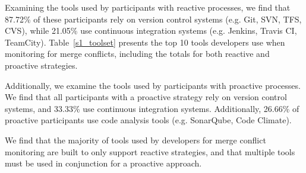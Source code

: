 
Examining the tools used by participants with reactive processes, we find that 87.72\% of these participants rely on version control systems (e.g. Git, SVN, TFS, CVS), while 21.05\% use continuous integration systems (e.g. Jenkins, Travis CI, TeamCity).
Table~\ref{s1_toolset} presents the top 10 tools developers use when monitoring for merge conflicts, including the totals for both reactive and proactive strategies.

Additionally, we examine the tools used by participants with proactive processes.
We find that all participants with a proactive strategy rely on version control systems, and 33.33\% use continuous integration systems.
Additionally, 26.66\% of proactive participants use code analysis tools (e.g. SonarQube, Code Climate).

We find that the majority of tools used by developers for merge conflict monitoring are built to only support reactive strategies, and that multiple tools must be used in conjunction for a proactive approach.


